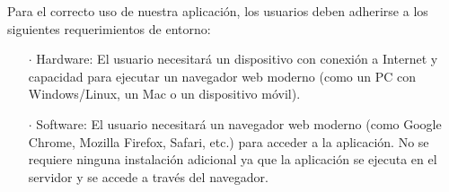 Para el correcto uso de nuestra aplicación, los usuarios deben adherirse a los siguientes requerimientos de entorno:

\begin{enumerate}
  \item[\(\cdot\)] Hardware: El usuario necesitará un dispositivo con conexión a Internet y capacidad para ejecutar un navegador web moderno (como un PC con Windows/Linux, un Mac o un dispositivo móvil).
  \item[\(\cdot\)] Software: El usuario necesitará un navegador web moderno (como Google Chrome, Mozilla Firefox, Safari, etc.) para acceder a la aplicación. No se requiere ninguna instalación adicional ya que la aplicación se ejecuta en el servidor y se accede a través del navegador.
\end{enumerate}
